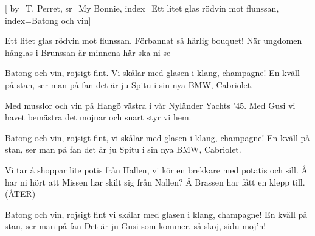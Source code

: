 


[ 		%
	by={T. Perret},					%
	sr={My Bonnie},					%
	index={Ett litet glas rödvin mot flunssan}, %
	index={Batong och vin}]						%
	
\beginverse*						%
Ett litet glas rödvin mot flunssan. 
Förbannat så härlig bouquet!
När ungdomen hånglas i Brunssan 
är minnena här ska ni se
\endverse							%

\beginchorus						%
Batong och vin,
rojsigt fint.
Vi skålar med glasen i klang,
champagne!
En kväll på stan, ser man på fan
det är ju Spitu i sin nya BMW, Cabriolet.
\endchorus							%

\beginverse*						%
Med musslor och vin på Hangö västra
i vår Nyländer Yachts ’45.
Med Gusi vi havet bemästra
det mojnar och snart styr vi hem.
\endverse							%

\beginchorus						%
Batong och vin,
rojsigt fint,
vi skålar med glasen i klang,
champagne!
En kväll på stan, ser man på fan
det är ju Spitu i sin nya BMW, Cabriolet.
\endchorus							%

\beginverse*						%
Vi tar å shoppar lite potis från Hallen,
vi kör en brekkare med potatis och sill.
Å har ni hört att Missen har skilt sig
från Nallen?
Å Brassen har fått en klepp till. (ÅTER)
\endverse							%

\beginchorus						%
Batong och vin, rojsigt fint
vi skålar med glasen i klang,
champagne!
En kväll på stan, ser man på fan
Det är ju Gusi som kommer, så skoj,
sidu moj'n!
\endchorus							%

\vspace{5mm}
\endsong							%